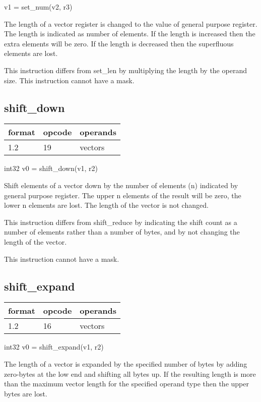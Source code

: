 \documentclass[forwardcom.tex]{subfiles}
\begin{document}
v1 = set\_num(v2, r3)
\vv

The length of a vector register is changed to the value of general purpose register. The length is indicated as number of elements. If the length is increased then the extra elements will be zero. If the length is decreased then the superfluous elements are lost.

\vv
This instruction differs from set\_len by multiplying the length by the operand size.
 This instruction cannot have a mask.


\subsection{shift\_down}
\label{table:shiftDownInstruction}
\begin{tabular}{|p{12mm}|p{15mm}|p{100mm}|}
\hline
\bfseries format & \bfseries opcode & \bfseries operands \\ \hline
1.2 & 19 & vectors \\ \hline
\end{tabular}
\vv

int32 v0 = shift\_down(v1, r2)
\vv

Shift elements of a vector down by the number of elements (n) indicated by general purpose register. 
The upper n elements of the result will be zero, the lower n elements are lost. The length of the vector is not changed.
\vv

This instruction differs from shift\_reduce by indicating the shift count as a number of elements rather than a number of bytes, and by not changing the length of the vector.
\vv

This instruction cannot have a mask.
\vv

\subsection{shift\_expand}
\label{table:shiftExpandInstruction}
\begin{tabular}{|p{12mm}|p{15mm}|p{100mm}|}
\hline
\bfseries format & \bfseries opcode & \bfseries operands \\ \hline
1.2 & 16 & vectors \\ \hline
\end{tabular}
\vv

int32 v0 = shift\_expand(v1, r2)
\vv

The length of a vector is expanded by the specified number of bytes by adding zero-bytes at the low end and shifting all bytes up. If the resulting length is more than the maximum vector length for the specified operand type then the upper bytes are lost.
\vv
\end{document}
